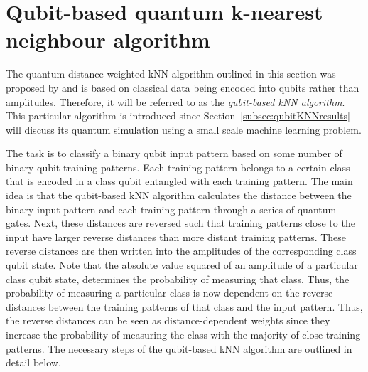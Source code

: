 \section{Qubit-based quantum k-nearest neighbour algorithm}
\label{subsec:quantumknearestneighbour}

The quantum distance-weighted kNN algorithm outlined in this section was proposed by  and is based on classical data being encoded into qubits rather than amplitudes. Therefore, it will be referred to as the \emph{qubit-based kNN algorithm}. This particular algorithm is introduced since Section~\ref{subsec:qubitKNNresults} will discuss its quantum simulation using a small scale machine learning problem.

The task is to classify a binary qubit input pattern based on some number of binary qubit training patterns. Each training pattern belongs to a certain class that is encoded in a class qubit entangled with each training pattern. The main idea is that the qubit-based kNN algorithm calculates the distance between the binary input pattern and each training pattern through a series of quantum gates. Next, these distances are reversed such that training patterns close to the input have larger reverse distances than more distant training patterns. These reverse distances are then written into the amplitudes of the corresponding class qubit state. Note that the absolute value squared of an amplitude of a particular class qubit state, determines the probability of measuring that class. Thus, the probability of measuring a particular class is now dependent on the reverse distances between the training patterns of that class and the input pattern. Thus, the reverse distances can be seen as distance-dependent weights since they increase the probability of measuring the class with the majority of close training patterns. The necessary steps of the qubit-based kNN algorithm are outlined in detail below.

